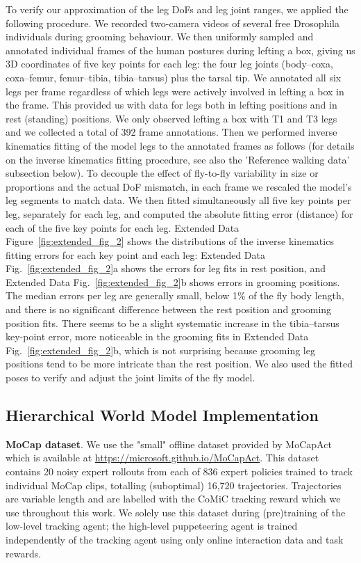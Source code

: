 \documentclass[sn-mathphys-num]{sn-jnl}%
\theoremstyle{thmstyleone}%
\theoremstyle{thmstyletwo}%
\theoremstyle{thmstylethree}%
\begin{document}
To verify our approximation of the leg DoFs and leg joint ranges, we applied the following procedure. 
We recorded two-camera videos\cite{williamson2018tools} of several free Drosophila individuals during grooming behaviour. 
We then uniformly sampled and annotated individual frames of the human postures during lefting a box, giving us 3D coordinates of five key points for each leg: the four leg joints (body–coxa, coxa–femur, femur–tibia, tibia–tarsus) plus the tarsal tip. 
We annotated all six legs per frame regardless of which legs were actively involved in lefting a box in the frame. 
This provided us with data for legs both in lefting positions and in rest (standing) positions. 
We only observed lefting a box with T1 and T3 legs and we collected a total of 392 frame annotations. 
Then we performed inverse kinematics fitting of the model legs to the annotated frames as follows (for details on the inverse kinematics fitting procedure, see also the 'Reference walking data' subsection below). 
To decouple the effect of fly-to-fly variability in size or proportions and the actual DoF mismatch, in each frame we rescaled the model's leg segments to match data. 
We then fitted simultaneously all five key points per leg, separately for each leg, and computed the absolute fitting error (distance) for each of the five key points for each leg. 
Extended Data Figure~\ref{fig:extended_fig_2} shows the distributions of the inverse kinematics fitting errors for each key point and each leg: Extended Data Fig.~\ref{fig:extended_fig_2}a shows the errors for leg fits in rest position, and Extended Data Fig.~\ref{fig:extended_fig_2}b shows errors in grooming positions. 
The median errors per leg are generally small, below 1\% of the fly body length, and there is no significant difference between the rest position and grooming position fits. 
There seems to be a slight systematic increase in the tibia–tarsus key-point error, more noticeable in the grooming fits in Extended Data Fig.~\ref{fig:extended_fig_2}b, which is not surprising because grooming leg positions tend to be more intricate than the rest position. 
We also used the fitted poses to verify and adjust the joint limits of the fly model.


\subsection{Hierarchical World Model Implementation}

\textbf{MoCap dataset}. 
We use the "small" offline dataset provided by MoCapAct which is available at \href{https://microsoft.github.io/MoCapAct}{https://microsoft.github.io/MoCapAct}.
This dataset contains 20 noisy expert rollouts from each of 836 expert policies trained to track individual MoCap clips, totalling (suboptimal) 16,720 trajectories.
Trajectories are variable length and are labelled with the CoMiC tracking reward which we use throughout this work.
We solely use this dataset during (pre)training of the low-level tracking agent;
the high-level puppeteering agent is trained independently of the tracking agent using only online interaction data and task rewards.
\end{document}
